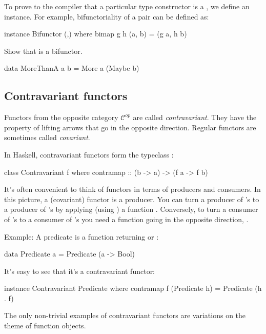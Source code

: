 \documentclass[DaoFP]{subfiles}
\begin{document}
To prove to the compiler that a particular type constructor is a , we define an instance. For example, bifunctoriality of a pair can be defined as:
\begin{haskell}
instance Bifunctor (,) where
  bimap g h (a, b) = (g a, h b)
\end{haskell}

\begin{exercise}
Show that  is a bifunctor.
\begin{haskell}
data MoreThanA a b = More a (Maybe b)
\end{haskell}
\end{exercise}


\subsection{Contravariant functors}

Functors from the opposite category $\mathcal{C}^{op}$ are called \emph{contravariant}. They have the property of lifting arrows that go in the opposite direction. Regular functors are sometimes called \emph{covariant}.

In Haskell, contravariant functors form the typeclass :
\begin{haskell}
class Contravariant f where
  contramap :: (b -> a) -> (f a -> f b)
\end{haskell}

It's often convenient to think of functors in terms of producers and consumers. In this picture, a (covariant) functor is a producer. You can turn a producer of 's to a producer of 's by applying (using ) a function . Conversely, to turn a consumer of 's to a consumer of 's you need a function going in the opposite direction, . 

Example: A predicate is a function returning  or :
\begin{haskell}
data Predicate a = Predicate (a -> Bool)
\end{haskell}
It's easy to see that it's a contravariant functor:
\begin{haskell}
instance Contravariant Predicate where
  contramap f (Predicate h) = Predicate (h . f)
\end{haskell}

The only non-trivial examples of contravariant functors are variations on the theme of function objects. 
\end{document}
